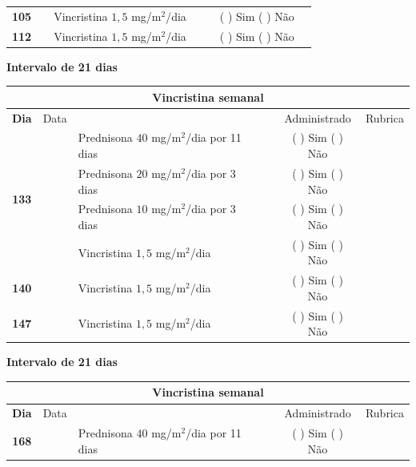 \documentclass[11pt,a4paper,oldfontcommands]{memoir}
\begin{document}
\begin{center}
\begin{table}[H]
\begin{tabular}{p{1cm}c|p{5cm}|p{1cm}p{2cm}|c|c}
    \cline{1-6}
    \multicolumn{1}{c|}{\textbf{105}}&&{Vincristina \(1,5\) mg/m\(^2\)/dia}&\multicolumn{1}{c}{}&&{(  ) Sim (  ) Não}&\\
    \cline{1-3}\cline{6-6}
    \multicolumn{1}{c|}{\textbf{112}}&&{Vincristina \(1,5\) mg/m\(^2\)/dia}&\multicolumn{1}{c}{}&&{(  ) Sim (  ) Não}&\\
    \hline
\end{tabular}
\end{table}
\textbf{Intervalo de 21 dias}
\begin{table}[H] \small
\begin{tabular}{p{1cm}c|p{5cm}|p{1cm}p{2cm}|c|c}
	\hline
	\multicolumn{7}{c}{Vincristina semanal} \\
	\hline
	\multicolumn{1}{c|}{\multirow{1}{*}{\textbf{Dia}}}&{Data}&{}&{}&&{Administrado}&{Rubrica} \\
    \hline
    \multicolumn{1}{c|}{\multirow{4}{*}{\textbf{133}}}&&{Prednisona \(40\) mg/m\(^2\)/dia por 11 dias}&\multicolumn{1}{c}{}&&{(  ) Sim (  ) Não}&\\
    \multicolumn{1}{c|}{}&&{Prednisona \(20\) mg/m\(^2\)/dia por 3 dias}&\multicolumn{1}{c}{}&&{(  ) Sim (  ) Não}&\\
    \multicolumn{1}{c|}{}&&{Prednisona \(10\) mg/m\(^2\)/dia por 3 dias}&\multicolumn{1}{c}{}&&{(  ) Sim (  ) Não}&\\
    \multicolumn{1}{c|}{\textbf{}}&&{Vincristina \(1,5\) mg/m\(^2\)/dia}&\multicolumn{1}{c}{}&&{(  ) Sim (  ) Não}&\\
    \cline{1-6}
    \multicolumn{1}{c|}{\textbf{140}}&&{Vincristina \(1,5\) mg/m\(^2\)/dia}&\multicolumn{1}{c}{}&&{(  ) Sim (  ) Não}&\\
    \cline{1-3}\cline{6-6}
    \multicolumn{1}{c|}{\textbf{147}}&&{Vincristina \(1,5\) mg/m\(^2\)/dia}&\multicolumn{1}{c}{}&&{(  ) Sim (  ) Não}&\\
    \hline
\end{tabular}
\end{table}
\textbf{Intervalo de 21 dias}
\begin{table}[H] \small
\begin{tabular}{p{1cm}c|p{5cm}|p{1cm}p{2cm}|c|c}
	\hline
	\multicolumn{7}{c}{Vincristina semanal} \\
	\hline
	\multicolumn{1}{c|}{\multirow{1}{*}{\textbf{Dia}}}&{Data}&{}&{}&&{Administrado}&{Rubrica} \\
    \hline
    \multicolumn{1}{c|}{\multirow{4}{*}{\textbf{168}}}&&{Prednisona \(40\) mg/m\(^2\)/dia por 11 dias}&\multicolumn{1}{c}{}&&{(  ) Sim (  ) Não}&\\

\end{tabular}
\end{table}
\end{center}
\end{document}
